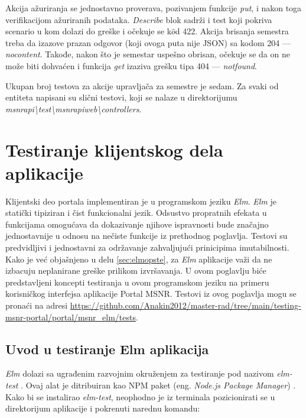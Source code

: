 \documentclass[12pt,oneside]{memoir}
\begin{document}
\par Akcija ažuriranja se jednostavno proverava, pozivanjem funkcije \emph{put}, i nakon toga verifikacijom ažuriranih podataka. \emph{Describe} blok sadrži i test koji pokriva scenario u kom dolazi do greške i očekuje se  k$\hat{o}$d 422. Akcija brisanja semestra treba da izazove prazan odgovor (koji ovoga puta nije JSON) sa kodom 204 --- \emph{no{\textunderscore}content}. Takođe, nakon što je semestar uspešno obrisan, očekuje se da on ne može biti dohvaćen i funkcija \emph{get} izaziva grešku tipa 404 --- \emph{not{\textunderscore}found}.
\par Ukupan broj testova za akcije upravljača za semestre je sedam. Za svaki od entiteta napisani su slični testovi, koji se nalaze u direktorijumu \emph{msnr{\textunderscore}api{\textbackslash}test{\textbackslash}msnr{\textunderscore}api{\textunderscore}web{\textbackslash}controllers}. 



\chapter{Testiranje klijentskog dela aplikacije}
\label{chp:testiranjeelm}
\par Klijentski deo portala implementiran je u programskom jeziku \emph{Elm}. \emph{Elm} je statički tipiziran i čist funkcionalni jezik. Odsustvo propratnih efekata u funkcijama omogućava da dokazivanje njihove ispravnosti bude značajno jednostavnije u odnosu na nečiste funkcije iz prethodnog poglavlja. Testovi su predvidljivi i jednostavni za održavanje zahvaljujući prinicipima imutabilnosti. Kako je već objašnjeno u delu \ref{sec:elmopste}, za \emph{Elm} aplikacije važi da ne izbacuju neplanirane greške prilikom izvršavanja. U ovom poglavlju biće predstavljeni koncepti testiranja u ovom programskom jeziku na primeru korisničkog interfejsa aplikacije Portal MSNR. Testovi iz ovog poglavlja mogu se pronaći na adresi \url{https://github.com/Anakin2012/master-rad/tree/main/testing-msnr-portal/portal/msnr_elm/tests}.

\section{Uvod u testiranje Elm aplikacija}
\label{sec:uvod-elm}

\par \emph{Elm} dolazi sa ugrađenim razvojnim okruženjem za testiranje pod nazivom \emph{elm-test} \cite{elm-test}. Ovaj alat je ditribuiran kao NPM paket (eng. \emph{Node.js Package Manager}) \cite{npm}. Kako bi se instalirao \emph{elm-test}, neophodno je iz terminala pozicionirati se u direktorijum aplikacije i pokrenuti narednu komandu: 
\end{document}
